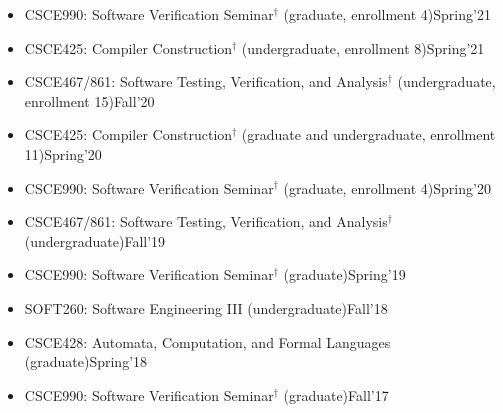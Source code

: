 \documentclass[11pt]{article}
\begin{document}
{      \begin{itemize}
        \item CSCE990: Software Verification Seminar$^{\dagger}$ (graduate, enrollment 4)\hfill Spring'21
        \item CSCE425: Compiler Construction$^{\dagger}$ (undergraduate, enrollment 8)\hfill Spring'21
        \item CSCE467/861: Software Testing, Verification, and Analysis$^{\dagger}$ (undergraduate, enrollment 15)\hfill Fall'20
        \item CSCE425: Compiler Construction$^{\dagger}$ (graduate and undergraduate, enrollment 11)\hfill Spring'20
        \item CSCE990: Software Verification Seminar$^{\dagger}$ (graduate, enrollment 4)\hfill Spring'20
        \item CSCE467/861: Software Testing, Verification, and Analysis$^{\dagger}$ (undergraduate)\hfill Fall'19
        \item CSCE990: Software Verification Seminar$^{\dagger}$ (graduate)\hfill Spring'19
        \item SOFT260: Software Engineering III (undergraduate)\hfill Fall'18
        \item CSCE428: Automata, Computation, and Formal Languages (graduate)\hfill Spring'18
        \item CSCE990: Software Verification Seminar$^{\dagger}$ (graduate)\hfill Fall'17

\end{itemize}}
\end{document}
